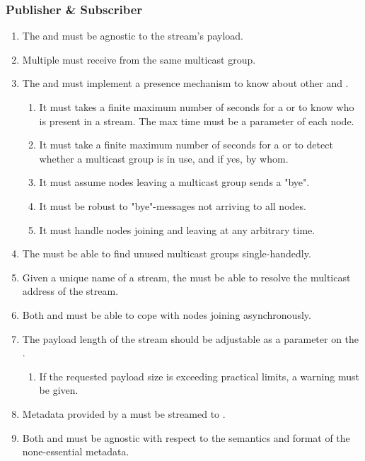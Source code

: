 \subsubsection{Publisher \& Subscriber}
\begin{enumerate}
	\item The  and  must be agnostic to the stream's payload.
	\item Multiple  must receive from the same multicast group.
	\item The  and  must implement a presence mechanism to know about other  and .
	\begin{enumerate}
		\item It must takes a finite maximum number of seconds for a  or  to know who is present in a stream. The max time must be a parameter of each node.
		\item It must take a finite maximum number of seconds for a  or  to detect whether a multicast group is in use, and if yes, by whom.
		\item It must assume nodes leaving a multicast group sends a "bye".
		\item It must be robust to "bye"-messages not arriving to all nodes.
		\item It must handle nodes joining and leaving at any arbitrary time.
	\end{enumerate}
	\item The  must be able to find unused multicast groups single-handedly.
	\item Given a unique name of a stream, the  must be able to resolve the multicast address of the stream.
	\item Both  and  must be able to cope with nodes joining asynchronously.
	\item The payload length of the stream should be adjustable as a parameter on the .
		\begin{enumerate}
			\item If the requested payload size is exceeding practical limits, a warning must be given.
		\end{enumerate}
	\item Metadata provided by a  must be streamed to .
	\item Both  and  must be agnostic with respect to the semantics and format of the none-essential metadata.
\end{enumerate}


